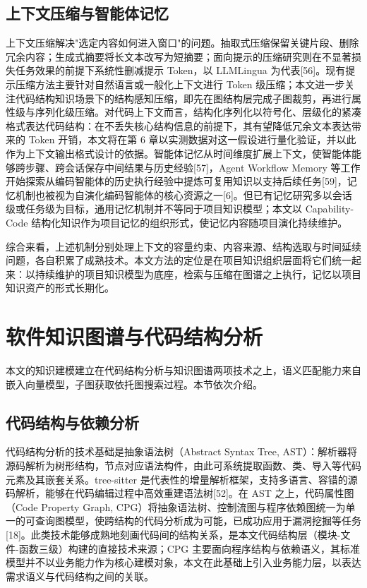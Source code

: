 \subsection{上下文压缩与智能体记忆}
上下文压缩解决"选定内容如何进入窗口"的问题。抽取式压缩保留关键片段、删除冗余内容；生成式摘要将长文本改写为短摘要；面向提示的压缩研究则在不显著损失任务效果的前提下系统性删减提示 Token，以 LLMLingua 为代表[56]。现有提示压缩方法主要针对自然语言或一般化上下文进行 Token 级压缩；本文进一步关注代码结构知识场景下的结构感知压缩，即先在图结构层完成子图裁剪，再进行属性级与序列化级压缩。对代码上下文而言，结构化序列化以符号化、层级化的紧凑格式表达代码结构：在不丢失核心结构信息的前提下，其有望降低冗余文本表达带来的 Token 开销，本文将在第 6 章以实测数据对这一假设进行量化验证，并以此作为上下文输出格式设计的依据。智能体记忆从时间维度扩展上下文，使智能体能够跨步骤、跨会话保存中间结果与历史经验[57]，Agent Workflow Memory 等工作开始探索从编码智能体的历史执行经验中提炼可复用知识以支持后续任务[59]，记忆机制也被视为自演化编码智能体的核心资源之一[6]。但已有记忆研究多以会话级或任务级为目标，通用记忆机制并不等同于项目知识模型；本文以 Capability-Code 结构化知识作为项目记忆的组织形式，使记忆内容随项目演化持续维护。

综合来看，上述机制分别处理上下文的容量约束、内容来源、结构选取与时间延续问题，各自积累了成熟技术。本文方法的定位是在项目知识组织层面将它们统一起来：以持续维护的项目知识模型为底座，检索与压缩在图谱之上执行，记忆以项目知识资产的形式长期化。


\section{软件知识图谱与代码结构分析}
本文的知识建模建立在代码结构分析与知识图谱两项技术之上，语义匹配能力来自嵌入向量模型，子图获取依托图搜索过程。本节依次介绍。


\subsection{代码结构与依赖分析}
代码结构分析的技术基础是抽象语法树（Abstract Syntax Tree, AST）：解析器将源码解析为树形结构，节点对应语法构件，由此可系统提取函数、类、导入等代码元素及其嵌套关系。tree-sitter 是代表性的增量解析框架，支持多语言、容错的源码解析，能够在代码编辑过程中高效重建语法树[52]。在 AST 之上，代码属性图（Code Property Graph, CPG）将抽象语法树、控制流图与程序依赖图统一为单一的可查询图模型，使跨结构的代码分析成为可能，已成功应用于漏洞挖掘等任务[18]。此类技术能够成熟地刻画代码间的结构关系，是本文代码结构层（模块-文件-函数三级）构建的直接技术来源；CPG 主要面向程序结构与依赖语义，其标准模型并不以业务能力作为核心建模对象，本文在此基础上引入业务能力层，以表达需求语义与代码结构之间的关联。


